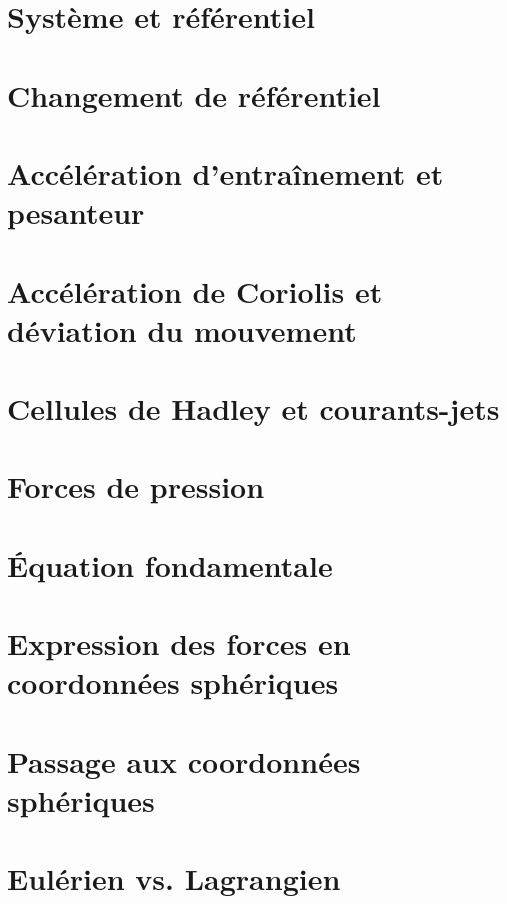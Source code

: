 \documentclass[a4paper,DIV16,10pt]{scrartcl}
\begin{document}
\newpage
\section{Système et référentiel}

\section{Changement de référentiel}


\newpage
\section{Accélération d'entraînement et pesanteur}


\newpage
\section{Accélération de Coriolis et déviation du mouvement}


\newpage
\section{Cellules de Hadley et courants-jets}


\newpage
\section{Forces de pression}


\newpage
\section{\'Equation fondamentale}

\section{Expression des forces en coordonnées sphériques}


\newpage
\section{Passage aux coordonnées sphériques}


\newpage
\section{Eulérien vs. Lagrangien}

\end{document}

